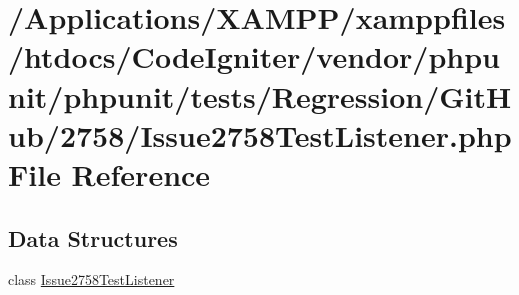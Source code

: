 \hypertarget{_issue2758_test_listener_8php}{}\section{/\+Applications/\+X\+A\+M\+P\+P/xamppfiles/htdocs/\+Code\+Igniter/vendor/phpunit/phpunit/tests/\+Regression/\+Git\+Hub/2758/\+Issue2758\+Test\+Listener.php File Reference}
\label{_issue2758_test_listener_8php}
\subsection*{Data Structures}
\begin{DoxyCompactItemize}
\item 
class \mbox{\hyperlink{class_issue2758_test_listener}{Issue2758\+Test\+Listener}}
\end{DoxyCompactItemize}
